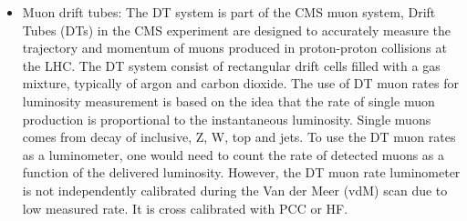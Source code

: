 \begin{itemize}

\item Muon drift tubes: The DT system is part of the CMS muon system, %
  Drift Tubes (DTs) in the CMS experiment are designed to accurately measure the trajectory and momentum of muons produced in proton-proton collisions at the LHC.
  The DT system consist of rectangular drift cells filled with a gas mixture, typically of argon and carbon dioxide. The use of DT muon rates for luminosity measurement is based on the idea that the rate of single muon production is proportional to the instantaneous luminosity. Single muons comes from decay of inclusive, Z, W, top and jets.
To use the DT muon rates as a luminometer, one would need to count the rate of detected muons as a function of the delivered luminosity. However, the DT muon rate luminometer is not independently calibrated during the Van der Meer (vdM) scan due to low measured rate. It is cross calibrated with PCC or HF.
  

\end{itemize}
